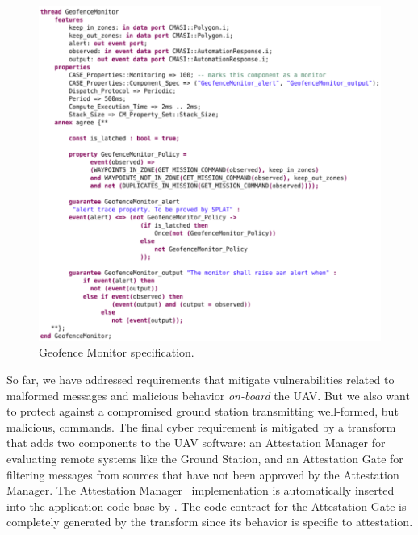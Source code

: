 
\begin{figure}[h]
	\centering
	\includegraphics[width=1\columnwidth]{figs/geofence-monitor.png}
	\caption{Geofence Monitor specification.}
	\label{fig:geofence-monitor}
\end{figure}

So far, we have addressed requirements that
mitigate vulnerabilities related to malformed messages and malicious behavior \textit{on-board} the UAV.  But we also want to protect against a compromised ground station transmitting well-formed, but malicious, commands. The final cyber requirement is mitigated by a transform that adds two components to the UAV software: an Attestation Manager for evaluating remote systems like the Ground Station, and an Attestation Gate for filtering messages from sources that have not been approved by the Attestation Manager.  The Attestation Manager \ckml\ implementation is automatically inserted into the application code base by \brfcs. The code contract for the Attestation Gate is completely generated by the transform since its behavior is specific to attestation.

